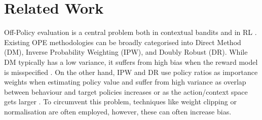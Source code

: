 \section{Related Work}
Off-Policy evaluation is a central problem both in contextual bandits \citep{dudik2014doubly, wang2017optimal, liu2018breaking, farajtabar2018more, su2019continuous, su2020doubly, kallus2021optimal, metelli2021subgaussian, saito2020open} and in RL \citep{thomas2016data, xie2019advances, kallus2020off, liu2020understanding}. 
Existing OPE methodologies can be broadly categorised into Direct Method (DM), Inverse Probability Weighting (IPW), and Doubly Robust (DR). 
While DM typically has a low variance, it suffers from high bias when the reward model is misspecified \citep{voloshin2021empirical}. 
On the other hand, IPW \citep{horvitz1952generalization} and DR \citep{dudik2014doubly, wang2017optimal, su2020doubly} use policy ratios as importance weights when estimating policy value and suffer from high variance as overlap between behaviour and target policies increases or as the action/context space gets larger \citep{sachdeva2020off, saito2022off}. To circumvent this problem, techniques like weight clipping or normalisation \citep{swaminathan2015counterfactual, swaminathan2015the, chaudhuri2019london} are often employed, however, these can often increase bias.





